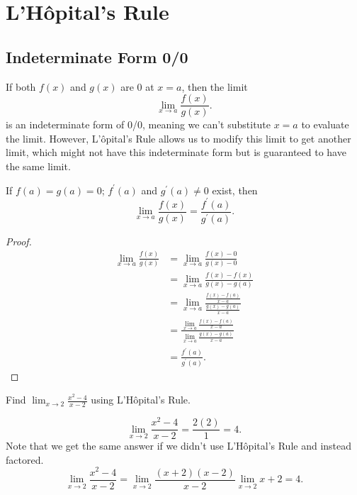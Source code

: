 \section{L'H\^{o}pital's Rule}
\subsection{Indeterminate Form 0/0}
If both $f(x)$ and $g(x)$ are 0 at $x=a$, then the limit
\begin{equation*}
	\lim_{x\to a}{\frac{f(x)}{g(x)}}.
\end{equation*}
is an indeterminate form of 0/0, meaning we can't substitute $x=a$ to evaluate the limit.
However, L'\^{o}pital's Rule allows us to modify this limit to get another limit, which might not have this indeterminate form but is guaranteed to have the same limit.

\begin{theorem}
	If $f(a) = g(a) = 0$; $f^\prime(a)$ and $g^\prime(a) \neq 0$ exist, then
	\begin{equation*}
		\lim_{x\to a}{\frac{f(x)}{g(x)}} = \frac{f^\prime(a)}{g^\prime(a)}.
	\end{equation*}
\end{theorem}
\begin{proof}
	\begin{align*}
		\lim_{x\to a}{\frac{f(x)}{g(x)}} &= \lim_{x\to a}{\frac{f(x)-0}{g(x)-0}} \\
		&= \lim_{x\to a}{\frac{f(x)-f(x)}{g(x)-g(a)}} \\
		&= \lim_{x\to a}{\frac{\frac{f(x)-f(a)}{x-a}}{\frac{g(x)-g(a)}{x-a}}} \\
		&= \frac{\lim_{x\to a}{\frac{f(x)-f(a)}{x-a}}}{\lim_{x\to a}{\frac{g(x)-g(a)}{x-a}}} \\
		&= \frac{f^\prime(a)}{g^\prime(a)}.
	\end{align*}
\end{proof}

\begin{example}
	Find $\lim_{x\to 2}{\frac{x^2-4}{x-2}}$ using L'H\^{o}pital's Rule.
\end{example}
\begin{equation*}
	\lim_{x\to 2}{\frac{x^2-4}{x-2}} = \frac{2(2)}{1} = 4.
\end{equation*}
\indent
Note that we get the same answer if we didn't use L'H\^{o}pital's Rule and instead factored.
\begin{equation*}
	\lim_{x\to 2}{\frac{x^2-4}{x-2}} = \lim_{x\to 2}{\frac{(x+2)(x-2)}{x-2}} \lim_{x\to 2}{x+2} = 4.
\end{equation*}

